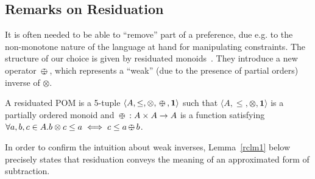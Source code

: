\documentclass{llncs}
\def\monid{{\mathbf 0}}
\def\monop{\otimes}
\def\odiv{\, {\ominus\hspace{-7.7pt} \div} \,}
\def\monid{\mathbf{1}}
\begin{document}
%
%
%

\subsection{Remarks on Residuation}\label{sec:ror}
It is often needed to be able to ``remove'' part of a preference, due e.g. 
to the non-monotone nature of the language at hand
for manipulating constraints. 
%
The structure of our choice is given by residuated monoids~\cite{golanShort}. 
%
They introduce a new operator $\odiv$, which represents a ``weak'' (due to the presence of partial orders) inverse of $\otimes$.

\begin{definition}[residuation]\label{def:repo}
	A residuated POM is a 5-tuple $\langle A, \leq, \monop, \odiv, \monid \rangle$ such that
	$\langle A, \leq, \monop, \monid \rangle$ is a partially ordered monoid and
	$\odiv: A \times A \rightarrow A$ is a function satisfying $\forall a, b, c \in A. b \monop c \leq a \iff c \leq a \odiv b$.
\end{definition}

%

In order to confirm the intuition about weak inverses,
Lemma~\ref{rclm1} below precisely states that residuation conveys the meaning of 
an approximated form of subtraction.
%
\end{document}
